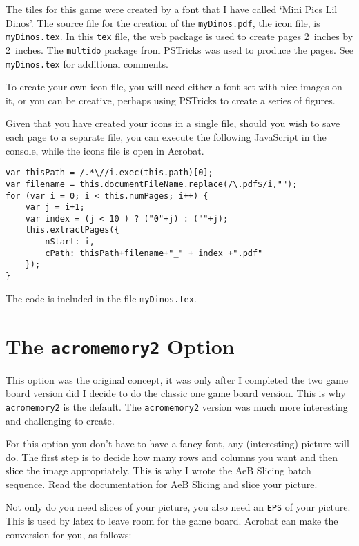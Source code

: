 \documentclass{article}
\begin{document}
The tiles for this game were created by a font that I have called
`Mini Pics Lil Dinos'. The source file for the creation of the
\texttt{myDinos.pdf}, the icon file, is \texttt{myDinos.tex}. In
this \texttt{tex} file, the \textsf{web} package is used to create
pages 2~inches by 2~inches. The \texttt{multido} package from
\textsf{PSTricks} was used to produce the pages. See
\texttt{myDinos.tex} for additional comments.

To create your own icon file, you will need either a font set with
nice images on it, or you can be creative, perhaps using
\textsf{PSTricks} to create a series of figures.

Given that you have created your icons in a single file, should you
wish to save each page to a separate file, you can execute the
following JavaScript in the console, while the icons file is open in
Acrobat.\smallskip
\begin{Verbatim}[xleftmargin=20pt,fontsize=\fontsize{9}{11}\selectfont]
var thisPath = /.*\//i.exec(this.path)[0];
var filename = this.documentFileName.replace(/\.pdf$/i,"");
for (var i = 0; i < this.numPages; i++) {
    var j = i+1;
    var index = (j < 10 ) ? ("0"+j) : (""+j);
    this.extractPages({
        nStart: i,
        cPath: thisPath+filename+"_" + index +".pdf"
    });
}
\end{Verbatim}
The code is included in the file \texttt{myDinos.tex}.


\section{The \texttt{acromemory2} Option}

This option was the original concept, it was only after I completed
the two game board version did I decide to do the classic one game
board version. This is why \texttt{acromemory2} is the default. The
\texttt{acromemory2} version was much more interesting and
challenging to create.

For this option you don't have to have a fancy font, any
(interesting)  picture will do. The first step is to decide how many
rows and columns you want and then slice the image appropriately.
This is why I wrote the \textsf{AeB Slicing} batch sequence. Read
the documentation for \textsf{AeB Slicing} and slice your picture.

Not only do you need slices of your picture, you also need an \texttt{EPS}
of your picture. This is used by latex to leave room for the game board.
Acrobat can make the conversion for you, as follows:
\end{document}

